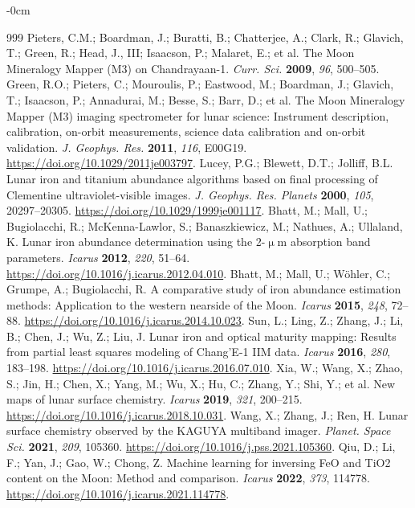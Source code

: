 \documentclass[remotesensing,article,submit,pdftex,moreauthors]{Definitions/mdpi}
\begin{document}
\begin{adjustwidth}{-\extralength}{0cm}
\begin{thebibliography}{999}
Pieters, C.M.; Boardman, J.; Buratti, B.; Chatterjee, A.; Clark, R.; Glavich, T.; Green, R.; Head, J., III; Isaacson, P.; Malaret, E.; et al. The Moon Mineralogy Mapper (M3) on Chandrayaan-1. \emph{Curr. Sci.} {\bf 2009}, \emph{96}, 500--505.
Green, R.O.; Pieters, C.; Mouroulis, P.; Eastwood, M.; Boardman, J.; Glavich, T.; Isaacson, P.; Annadurai, M.; Besse, S.; Barr, D.; et al. The Moon Mineralogy Mapper (M3) imaging spectrometer for lunar science: Instrument description, calibration, on-orbit measurements, science data calibration and on-orbit validation. \emph{J. Geophys. Res.} {\bf 2011}, \emph{116}, E00G19. \url{https://doi.org/10.1029/2011je003797}.
Lucey, P.G.; Blewett, D.T.; Jolliff, B.L. Lunar iron and titanium abundance algorithms based on final processing of Clementine ultraviolet-visible images. \emph{J. Geophys. Res. Planets} {\bf 2000}, \emph{105}, 20297--20305. \url{https://doi.org/10.1029/1999je001117}.
Bhatt, M.; Mall, U.; Bugiolacchi, R.; McKenna-Lawlor, S.; Banaszkiewicz, M.; Nathues, A.; Ullaland, K. Lunar iron abundance determination using the 2-$\upmu$m absorption band parameters. \emph{Icarus} {\bf 2012}, \emph{220}, 51--64. \url{https://doi.org/10.1016/j.icarus.2012.04.010}.
Bhatt, M.; Mall, U.; Wöhler, C.; Grumpe, A.; Bugiolacchi, R. A comparative study of iron abundance estimation methods: Application to the western nearside of the Moon. \emph{Icarus} {\bf 2015}, \emph{248}, 72--88. \url{https://doi.org/10.1016/j.icarus.2014.10.023}.
Sun, L.; Ling, Z.; Zhang, J.; Li, B.; Chen, J.; Wu, Z.; Liu, J. Lunar iron and optical maturity mapping: Results from partial least squares modeling of Chang'E-1 IIM data. \emph{Icarus} {\bf 2016}, \emph{280}, 183--198. \url{https://doi.org/10.1016/j.icarus.2016.07.010}.
Xia, W.; Wang, X.; Zhao, S.; Jin, H.; Chen, X.; Yang, M.; Wu, X.; Hu, C.; Zhang, Y.; Shi, Y.; et al. New maps of lunar surface chemistry. \emph{Icarus} {\bf 2019}, \emph{321}, 200--215. \url{https://doi.org/10.1016/j.icarus.2018.10.031}.
Wang, X.; Zhang, J.; Ren, H. Lunar surface chemistry observed by the KAGUYA multiband imager. \emph{Planet. Space Sci.} {\bf 2021}, \emph{209}, 105360. \url{https://doi.org/10.1016/j.pss.2021.105360}.
Qiu, D.; Li, F.; Yan, J.; Gao, W.; Chong, Z. Machine learning for inversing FeO and TiO2 content on the Moon: Method and comparison. \emph{Icarus} {\bf 2022}, \emph{373}, 114778. \url{https://doi.org/10.1016/j.icarus.2021.114778}.

\end{thebibliography}
\end{adjustwidth}
\end{document}
